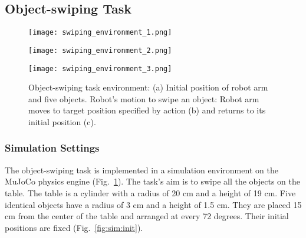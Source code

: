 \documentclass[sn-mathphys-num]{sn-jnl}
\begin{document}
\subsection{Object-swiping Task}

\begin{figure}[t]
    \centering
    \begin{minipage}[b]{0.3\linewidth}
        \centering
        \texttt{[image: swiping\_environment\_1.png]}
        \subcaption{}
        \label{fig:sim:init}
    \end{minipage}
    \begin{minipage}[b]{0.3\linewidth}
        \centering
        \texttt{[image: swiping\_environment\_2.png]}
        \subcaption{}
        \label{fig:sim:swipe}
    \end{minipage}
    \begin{minipage}[b]{0.3\linewidth}
        \centering
        \texttt{[image: swiping\_environment\_3.png]}
        \subcaption{}
        \label{fig:sim:return}
    \end{minipage}
    \caption{Object-swiping task environment: (a) Initial position of robot arm and five objects.
    Robot's motion to swipe an object: Robot arm moves to target position specified by action (b) and returns to its initial position (c).}
    \label{fig:swiping:sim}
\end{figure}

\subsubsection{Simulation Settings}
The object-swiping task is implemented in a simulation environment on the MuJoCo physics engine \cite{6386109} (Fig.~\ref{fig:swiping:sim}).
The task's aim is to swipe all the objects on the table.
The table is a cylinder with a radius of 20 cm and a height of 19 cm.
Five identical objects have a radius of 3 cm and a height of 1.5 cm.
They are placed 15 cm from the center of the table and arranged at every 72 degrees.
Their initial positions are fixed (Fig.~\ref{fig:sim:init}).
\end{document}
